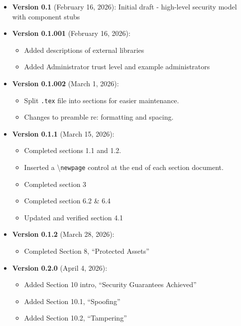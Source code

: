 \documentclass[../veristore_security_model.tex]{subfiles}
\begin{document}
\begin{itemize}
    \item \textbf{Version 0.1} (February 16, 2026): Initial draft - high-level security model with component stubs
    \item \textbf{Version 0.1.001} (February 16, 2026):
    \begin{itemize}
        \item Added descriptions of external libraries
        \item Added Administrator trust level and example administrators
    \end{itemize}
    \item \textbf{Version 0.1.002} (March 1, 2026):
    \begin{itemize}
        \item Split \texttt{.tex} file into sections for easier maintenance.
        \item Changes to preamble re: formatting and spacing.
    \end{itemize}
    \item \textbf{Version 0.1.1} (March 15, 2026):
    \begin{itemize}
        \item Completed sections 1.1 and 1.2.
        \item Inserted a \textbackslash\texttt{newpage} control at the end of each section document.
        \item Completed section 3
        \item Completed section 6.2 \& 6.4
        \item Updated and verified section 4.1
    \end{itemize}
    \item \textbf{Version 0.1.2} (March 28, 2026):
    \begin{itemize}
        \item Completed Section 8, ``Protected Assets''
    \end{itemize}
    \item \textbf{Version 0.2.0} (April 4, 2026):
    \begin{itemize}
        \item Added Section 10 intro, ``Security Guarantees Achieved''
        \item Added Section 10.1, ``Spoofing''
        \item Added Section 10.2, ``Tampering''
    \end{itemize}
\end{itemize}

\newpage
\end{document}
